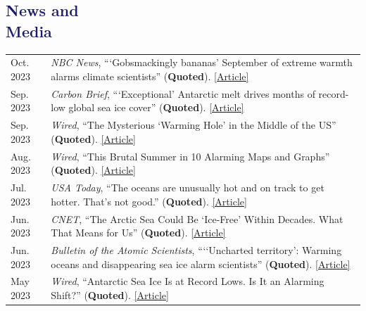 \documentclass[margin,line,palatino,courier,10pt]{res}
\begin{document}
\begin{resume}
\section{\sc \textcolor{MidnightBlue}{\large{\textbf{News and\\ Media}}}}
\vspace*{0.04in}
\begin{tabular}{@{}p{0.9in}p{4in}}
Oct. 2023 & \textit{NBC News}, ```Gobsmackingly bananas' September of extreme warmth alarms climate scientists'' (\textbf{Quoted}). \href{https://www.nbcnews.com/science/science-news/heat-september-extreme-warmth-climate-rcna118401}{[Article]}\\
Sep. 2023 & \textit{Carbon Brief}, ```Exceptional' Antarctic melt drives months of record-low global sea ice cover'' (\textbf{Quoted}). \href{https://www.carbonbrief.org/exceptional-antarctic-melt-drives-months-of-record-low-global-sea-ice-cover/}{[Article]}\\
Sep. 2023 & \textit{Wired}, ``The Mysterious `Warming Hole' in the Middle of the US'' (\textbf{Quoted}). \href{https://www.wired.com/story/the-mysterious-warming-hole-in-the-middle-of-the-us/}{[Article]}\\
Aug. 2023 & \textit{Wired}, ``This Brutal Summer in 10 Alarming Maps and Graphs'' (\textbf{Quoted}). \href{https://www.wired.com/story/this-brutal-summer-in-10-alarming-maps-and-graphs/}{[Article]}\\
Jul. 2023 & \textit{USA Today}, ``The oceans are unusually hot and on track to get hotter. That’s not good.'' (\textbf{Quoted}). \href{https://www.usatoday.com/story/news/nation/2023/07/04/heat-waves-in-oceans-fueled-by-climate-change/70339174007/}{[Article]}\\
Jun. 2023 & \textit{CNET}, ``The Arctic Sea Could Be `Ice-Free' Within Decades. What That Means for Us'' (\textbf{Quoted}). \href{https://www.cnet.com/science/climate/the-arctic-sea-could-be-ice-free-within-decades-what-that-means-for-us/}{[Article]}\\
Jun. 2023 & \textit{Bulletin of the Atomic Scientists}, ```‘Uncharted territory': Warming oceans and disappearing sea ice alarm scientists'' (\textbf{Quoted}). \href{https://thebulletin.org/2023/06/uncharted-territory-warming-oceans-and-disappearing-sea-ice-alarm-scientists/}{[Article]}\\
May 2023 & \textit{Wired}, ``Antarctic Sea Ice Is at Record Lows. Is It an Alarming Shift?'' (\textbf{Quoted}). \href{https://www.wired.com/story/antarctic-sea-ice-is-at-record-lows-is-it-an-alarming-shift/}{[Article]}\\

\end{tabular}
\end{resume}
\end{document}
